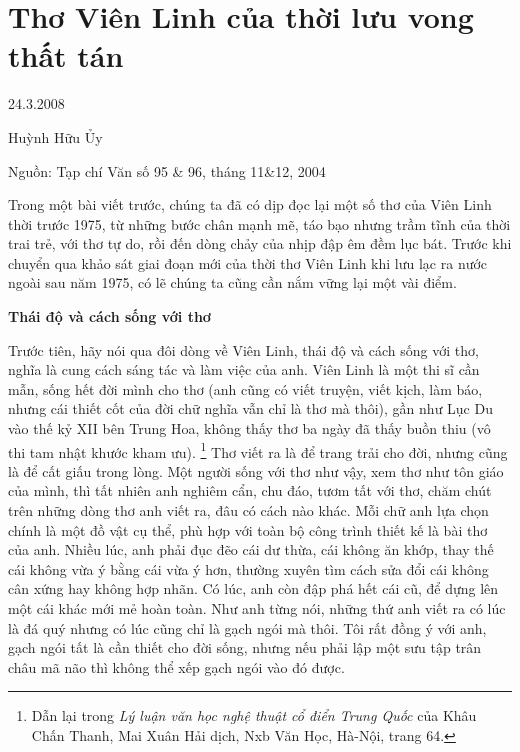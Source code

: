 \documentclass[../main.tex]{subfiles}
\begin{document}
\chapter{Thơ Viên Linh của thời lưu vong thất tán}

\begin{metadata}

\begin{flushright}24.3.2008\end{flushright}

Huỳnh Hữu Ủy

Nguồn: Tạp chí Văn số 95 & 96, tháng 11&12, 2004

\end{metadata}

\begin{multicols}{2}

Trong một bài viết trước, chúng ta đã có dịp đọc lại một số thơ của Viên Linh thời trước 1975, từ những bước chân mạnh mẽ, táo bạo nhưng trầm tĩnh của thời trai trẻ, với thơ tự do, rồi đến dòng chảy của nhịp đập êm đềm lục bát. Trước khi chuyển qua khảo sát giai đoạn mới của thời thơ Viên Linh khi lưu lạc ra nước ngoài sau năm 1975, có lẽ chúng ta cũng cần nắm vững lại một vài điểm. 
 
 
\textbf{Thái độ và cách sống với thơ } 
 
Trước tiên, hãy nói qua đôi dòng về Viên Linh, thái độ và cách sống với thơ, nghĩa là cung cách sáng tác và làm việc của anh. Viên Linh là một thi sĩ cần mẫn, sống hết đời mình cho thơ (anh cũng có viết truyện, viết kịch, làm báo, nhưng cái thiết cốt của đời chữ nghĩa vẫn chỉ là thơ mà thôi), gần như Lục Du vào thế kỷ XII bên Trung Hoa, không thấy thơ ba ngày đã thấy buồn thiu (vô thi tam nhật khước kham ưu). \footnote{
Dẫn lại trong \textit{Lý luận văn học nghệ thuật cổ điển Trung Quốc} của Khâu Chấn Thanh, Mai Xuân Hải dịch, Nxb Văn Học, Hà-Nội, trang 64.}  Thơ viết ra là để trang trải cho đời, nhưng cũng là để cất giấu trong lòng. Một người sống với thơ như vậy, xem thơ như tôn giáo của mình, thì tất nhiên anh nghiêm cẩn, chu đáo, tươm tất với thơ, chăm chút trên những dòng thơ anh viết ra, đâu có cách nào khác. Mỗi chữ anh lựa chọn chính là một đồ vật cụ thể, phù hợp với toàn bộ công trình thiết kế là bài thơ của anh. Nhiều lúc, anh phải đục đẽo cái dư thừa, cái không ăn khớp, thay thế cái không vừa ý bằng cái vừa ý hơn, thường xuyên tìm cách sửa đổi cái không cân xứng hay không hợp nhãn. Có lúc, anh còn đập phá hết cái cũ, để dựng lên một cái khác mới mẻ hoàn toàn. Như anh từng nói, những thứ anh viết ra có lúc là đá quý nhưng có lúc cũng chỉ là gạch ngói mà thôi. Tôi rất đồng ý với anh, gạch ngói tất là cần thiết cho đời sống, nhưng nếu phải lập một sưu tập trân châu mã não thì không thể xếp gạch ngói vào đó được. 
 

\end{multicols}
\end{document}

